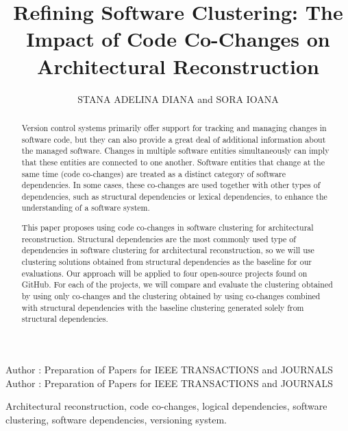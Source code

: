 \documentclass{ieeeaccess}
\begin{document}

\title{Refining Software Clustering: The Impact of Code Co-Changes on Architectural Reconstruction}
\author{\uppercase{Stana Adelina Diana} and
\uppercase{Sora Ioana}
}

\address[1]{Computer Science and Engineering Department
”Politehnica” University of Timisoara, Romania (e-mail: stana.adelina.diana@gmail.com)}
\address[2]{Computer Science and Engineering Department
”Politehnica” University of Timisoara, Romania (e-mail: ioana.sora@cs.upt.ro)}

\markboth
{Author \headeretal: Preparation of Papers for IEEE TRANSACTIONS and JOURNALS}
{Author \headeretal: Preparation of Papers for IEEE TRANSACTIONS and JOURNALS}



\begin{abstract}
Version control systems primarily offer support for tracking and managing changes in software code, but they can also provide a great deal of additional information about the managed software. Changes in multiple software entities simultaneously can imply that these entities are connected to one another. Software entities that change at the same time (code co-changes) are treated as a distinct category of software dependencies. In some cases, these co-changes are used together with other types of dependencies, such as structural dependencies or lexical dependencies, to enhance the understanding of a software system.


This paper proposes using code co-changes in software clustering for architectural reconstruction. Structural dependencies are the most commonly used type of dependencies in software clustering for architectural reconstruction, so we will use clustering solutions obtained from structural dependencies as the baseline for our evaluations. Our approach will be applied to four open-source projects found on GitHub. For each of the projects, we will compare and evaluate the clustering obtained by using only co-changes and the clustering obtained by using co-changes combined with structural dependencies with the baseline clustering generated solely from structural dependencies.
\end{abstract}

\begin{keywords}
Architectural reconstruction, code co-changes, logical dependencies, software clustering, software dependencies, versioning system.
\end{keywords}
\end{document}
